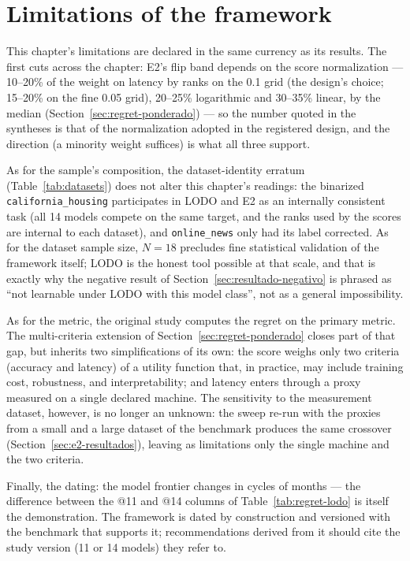 \section{Limitations of the framework}
\label{sec:limitacoes-framework}

This chapter's limitations are declared in the same currency as its
results. The first cuts across the chapter: E2's flip band depends
on the score normalization --- 10--20\% of the weight on latency by
ranks on the 0.1 grid (the design's choice; 15--20\% on the fine
0.05 grid), 20--25\% logarithmic and 30--35\%
linear, by the median (Section~\ref{sec:regret-ponderado}) --- so
the number quoted in the syntheses is that of the normalization
adopted in the registered design, and the direction (a minority
weight suffices) is
what all three support.

As for the sample's composition, the dataset-identity erratum
(Table~\ref{tab:datasets}) does not alter this chapter's readings:
the binarized \texttt{california\_\allowbreak housing} participates
in LODO and E2 as an internally consistent task (all 14 models
compete on the same target, and the ranks used by the scores are
internal to each dataset), and \texttt{online\_news} only had its
label corrected. As for the dataset sample size, $N{=}18$ precludes
fine statistical validation of the framework itself; LODO is the
honest tool possible at that scale, and that is exactly why the
negative result of Section~\ref{sec:resultado-negativo} is phrased
as ``not learnable under LODO with this model class'', not as a
general impossibility.

As for the metric, the original study computes the regret on the
primary metric. The multi-criteria extension of
Section~\ref{sec:regret-ponderado} closes part of that gap, but
inherits two simplifications of its own: the score weighs only two
criteria (accuracy and latency) of a utility function that, in
practice, may include training cost, robustness, and
interpretability; and latency enters through a proxy measured on a
single declared machine. The sensitivity to the measurement dataset,
however, is no longer an unknown: the sweep re-run with the proxies
from a small and a large dataset of the benchmark produces the same crossover
(Section~\ref{sec:e2-resultados}), leaving as limitations only the
single machine and the two criteria.

Finally, the dating: the model frontier changes in cycles of months
--- the difference between the @11 and @14 columns of
Table~\ref{tab:regret-lodo} is itself the demonstration. The
framework is dated by construction and versioned with the benchmark
that supports it; recommendations derived from it should cite the
study version (11 or 14 models) they refer to.

